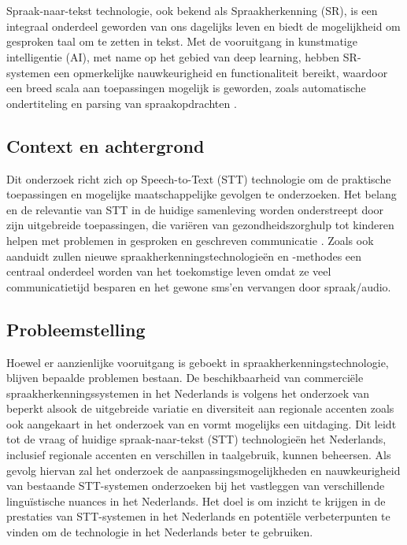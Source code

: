
\chapter{}%
\label{ch:inleiding}

Spraak-naar-tekst technologie, ook bekend als Spraakherkenning (SR), is een integraal onderdeel geworden van ons dagelijks leven en biedt de mogelijkheid om gesproken taal om te zetten in tekst. Met de vooruitgang in kunstmatige intelligentie (AI), met name op het gebied van deep learning, hebben SR-systemen een opmerkelijke nauwkeurigheid en functionaliteit bereikt, waardoor een breed scala aan toepassingen mogelijk is geworden, zoals automatische ondertiteling en parsing van spraakopdrachten \autocite{Roepke2019}.

\section{Context en achtergrond}
Dit onderzoek richt zich op Speech-to-Text (STT) technologie om de praktische toepassingen en mogelijke maatschappelijke gevolgen te onderzoeken. Het belang en de relevantie van STT in de huidige samenleving worden onderstreept door zijn uitgebreide toepassingen, die variëren van gezondheidszorghulp tot kinderen helpen met problemen in gesproken en geschreven communicatie \autocite{Kambouri2023}. Zoals \textcite{Shakhovska2019} ook aanduidt zullen nieuwe spraakherkenningstechnologieën en -methodes een centraal onderdeel
worden van het toekomstige leven omdat ze veel communicatietijd besparen en het gewone sms’en vervangen door spraak/audio.


\section{Probleemstelling}
Hoewel er aanzienlijke vooruitgang is geboekt in spraakherkenningstechnologie, blijven bepaalde problemen bestaan. De beschikbaarheid van commerciële spraakherkenningssystemen in het Nederlands is volgens het onderzoek van \textcite{Wei2022} beperkt alsook de uitgebreide variatie en diversiteit aan regionale accenten zoals ook aangekaart in het onderzoek van \autocite{ghyselen2020clearing} en \autocite{barbiers2004reflexieven} vormt mogelijks een uitdaging. Dit leidt tot de vraag of huidige spraak-naar-tekst (STT) technologieën het Nederlands, inclusief regionale accenten en verschillen in taalgebruik, kunnen beheersen. Als gevolg hiervan zal het onderzoek de aanpassingsmogelijkheden en nauwkeurigheid van bestaande STT-systemen onderzoeken bij het vastleggen van verschillende linguïstische nuances in het Nederlands. Het doel is om inzicht te krijgen in de prestaties van STT-systemen in het Nederlands en potentiële verbeterpunten te vinden om de technologie in het Nederlands beter te gebruiken.

